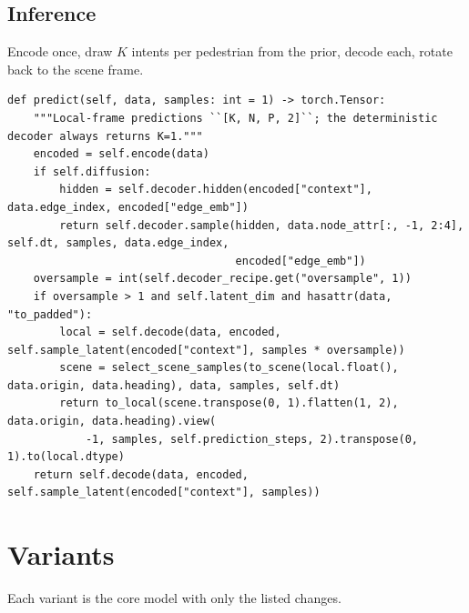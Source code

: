 \documentclass[10pt]{article}
\begin{document}
\subsection{Inference}
Encode once, draw $K$ intents per pedestrian from the prior, decode each, rotate back to the scene frame.

\par\smallskip{}\par\nopagebreak
\begin{lstlisting}[aboveskip=2pt]
def predict(self, data, samples: int = 1) -> torch.Tensor:
    """Local-frame predictions ``[K, N, P, 2]``; the deterministic decoder always returns K=1."""
    encoded = self.encode(data)
    if self.diffusion:
        hidden = self.decoder.hidden(encoded["context"], data.edge_index, encoded["edge_emb"])
        return self.decoder.sample(hidden, data.node_attr[:, -1, 2:4], self.dt, samples, data.edge_index,
                                   encoded["edge_emb"])
    oversample = int(self.decoder_recipe.get("oversample", 1))
    if oversample > 1 and self.latent_dim and hasattr(data, "to_padded"):
        local = self.decode(data, encoded, self.sample_latent(encoded["context"], samples * oversample))
        scene = select_scene_samples(to_scene(local.float(), data.origin, data.heading), data, samples, self.dt)
        return to_local(scene.transpose(0, 1).flatten(1, 2), data.origin, data.heading).view(
            -1, samples, self.prediction_steps, 2).transpose(0, 1).to(local.dtype)
    return self.decode(data, encoded, self.sample_latent(encoded["context"], samples))
\end{lstlisting}

\section{Variants}\label{sec:variants}
Each variant is the core model with only the listed changes.
\end{document}
